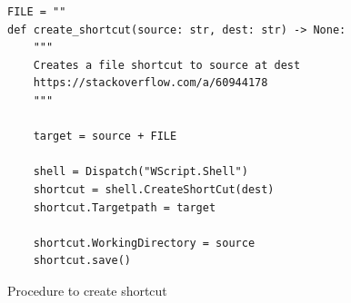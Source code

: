 \documentclass[11pt]{article}
\begin{document}
        \newpage
        \begin{listing}[!h]
            \begin{verbatim}
FILE = ""
def create_shortcut(source: str, dest: str) -> None:
    """ 
    Creates a file shortcut to source at dest 
    https://stackoverflow.com/a/60944178
    """
    
    target = source + FILE
    
    shell = Dispatch("WScript.Shell")    
    shortcut = shell.CreateShortCut(dest)
    shortcut.Targetpath = target
    
    shortcut.WorkingDirectory = source
    shortcut.save()
            \end{verbatim}
            \caption{Procedure to create shortcut}
            \label{sc:create_shortcut_c1}
        \end{listing}

        
\end{document}
